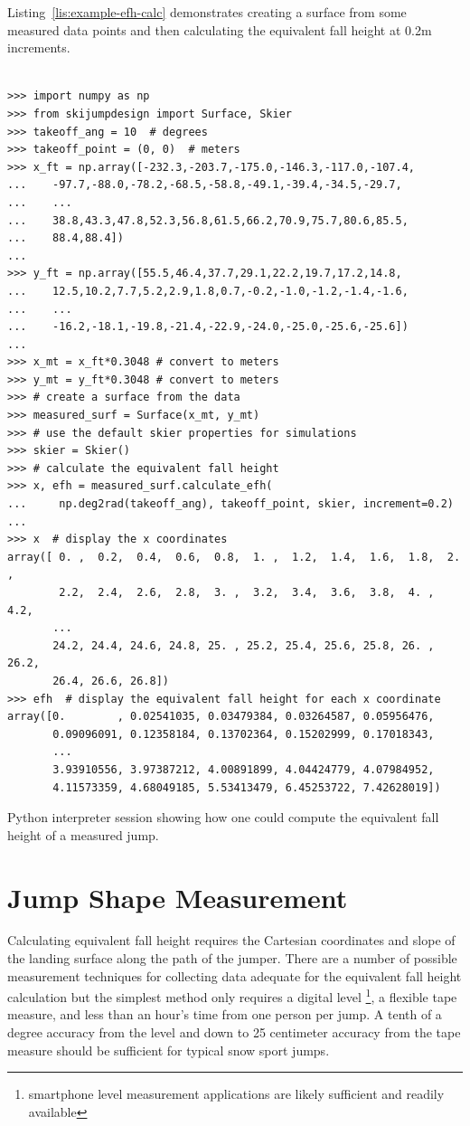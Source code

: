 \documentclass[smallextended]{svjour3}       %
\begin{document}
Listing~\ref{lis:example-efh-calc} demonstrates creating a surface from some
measured data points and then calculating the equivalent fall height at
0.2\si{\meter} increments.
%
\begin{listing*}
  \begin{verbatim}

>>> import numpy as np
>>> from skijumpdesign import Surface, Skier
>>> takeoff_ang = 10  # degrees
>>> takeoff_point = (0, 0)  # meters
>>> x_ft = np.array([-232.3,-203.7,-175.0,-146.3,-117.0,-107.4,
...    -97.7,-88.0,-78.2,-68.5,-58.8,-49.1,-39.4,-34.5,-29.7,
...    ...
...    38.8,43.3,47.8,52.3,56.8,61.5,66.2,70.9,75.7,80.6,85.5,
...    88.4,88.4])
...
>>> y_ft = np.array([55.5,46.4,37.7,29.1,22.2,19.7,17.2,14.8,
...    12.5,10.2,7.7,5.2,2.9,1.8,0.7,-0.2,-1.0,-1.2,-1.4,-1.6,
...    ...
...    -16.2,-18.1,-19.8,-21.4,-22.9,-24.0,-25.0,-25.6,-25.6])
...
>>> x_mt = x_ft*0.3048 # convert to meters
>>> y_mt = y_ft*0.3048 # convert to meters
>>> # create a surface from the data
>>> measured_surf = Surface(x_mt, y_mt)
>>> # use the default skier properties for simulations
>>> skier = Skier()
>>> # calculate the equivalent fall height
>>> x, efh = measured_surf.calculate_efh(
...     np.deg2rad(takeoff_ang), takeoff_point, skier, increment=0.2)
...
>>> x  # display the x coordinates
array([ 0. ,  0.2,  0.4,  0.6,  0.8,  1. ,  1.2,  1.4,  1.6,  1.8,  2. ,
        2.2,  2.4,  2.6,  2.8,  3. ,  3.2,  3.4,  3.6,  3.8,  4. ,  4.2,
       ...
       24.2, 24.4, 24.6, 24.8, 25. , 25.2, 25.4, 25.6, 25.8, 26. , 26.2,
       26.4, 26.6, 26.8])
>>> efh  # display the equivalent fall height for each x coordinate
array([0.        , 0.02541035, 0.03479384, 0.03264587, 0.05956476,
       0.09096091, 0.12358184, 0.13702364, 0.15202999, 0.17018343,
       ...
       3.93910556, 3.97387212, 4.00891899, 4.04424779, 4.07984952,
       4.11573359, 4.68049185, 5.53413479, 6.45253722, 7.42628019])
  \end{verbatim}
  \caption{Python interpreter session showing how one could compute the
  equivalent fall height of a measured jump.}
  \label{lis:example-efh-calc}
\end{listing*}

\section{Jump Shape Measurement}
\label{sec:jump-shape-measurement}
%
Calculating equivalent fall height requires the Cartesian coordinates and slope
of the landing surface along the path of the jumper. There are a number of
possible measurement techniques for collecting data adequate for the equivalent
fall height calculation but the simplest method only requires a digital level
\footnote{smartphone level measurement applications are likely sufficient and
readily available}, a flexible tape measure, and less than an hour's time from
one person per jump. A tenth of a degree accuracy from the level and down to 25
centimeter accuracy from the tape measure should be sufficient for typical snow
sport jumps.
\end{document}

